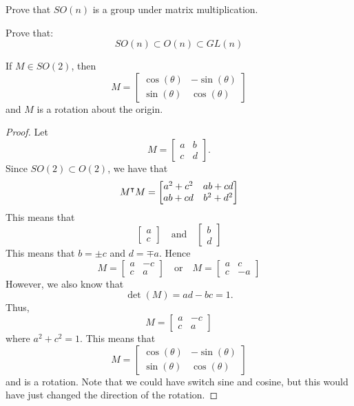 \documentclass{ximera}
\begin{document}
\begin{exercise}
  Prove that $SO(n)$ is a group under matrix multiplication.
\end{exercise}


\begin{exercise}
  Prove that:
  \[
  SO(n) \subset O(n) \subset GL(n)
  \]
\end{exercise}

\begin{lemma}
  If $M\in SO(2)$, then
  \[
  M =
  \begin{bmatrix}
    \cos(\theta) & -\sin(\theta) \\
    \sin(\theta) & \cos(\theta)
  \end{bmatrix}
  \]
  and $M$ is a rotation about the origin.
  \begin{proof}
    Let
    \[
    M=
    \begin{bmatrix}
      a & b \\
      c & d
    \end{bmatrix}.
    \]
    Since $SO(2) \subset O(2)$, we have that
    \[
    M^\intercal M =
    \begin{bmatrix}
      a^2+c^2 & ab+cd\\
      ab + cd & b^2+d^2
    \end{bmatrix}
    \]
    This means that
    \[
    \begin{bmatrix}
      a\\
      c
    \end{bmatrix}
    \quad\text{and}\quad
    \begin{bmatrix}
      b\\
      d
    \end{bmatrix}
    \]
    This means that $b= \pm c$ and $d = \mp a$. Hence
    \[
    M = \begin{bmatrix}
      a & -c \\
      c & a
    \end{bmatrix}
    \quad\text{or}\quad
    M = \begin{bmatrix}
      a & c \\
      c & -a
    \end{bmatrix}
    \]
    However, we also know that
    \[
    \det(M)  = ad-bc = 1.
    \]
    Thus, 
    \[
     M = \begin{bmatrix}
      a & -c \\
      c & a
    \end{bmatrix}
     \]
     where $a^2 + c^2 = 1$. This means that
     \[
     M =
     \begin{bmatrix}
       \cos(\theta) & -\sin(\theta) \\
       \sin(\theta) & \cos(\theta)
     \end{bmatrix}
     \]
     and is a rotation. Note that we could have switch sine and
     cosine, but this would have just changed the direction of the
     rotation.
  \end{proof}
\end{lemma}
\end{document}

